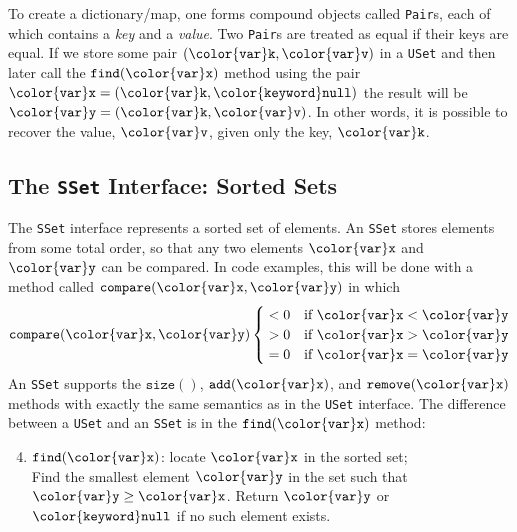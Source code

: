 \documentclass[10pt]{book}
\newcommand{\seclabel}[1]{\label{sec:#1}}
\theoremstyle{plain}
\theoremstyle{definition}
\begin{document}
To create a dictionary/map, one forms compound objects called \texttt{Pair}s,
%
each of which contains a \emph{key} and a \emph{value}. Two \texttt{Pair}s
are treated as equal if their keys are equal.  If we store some pair
$(\ensuremath{\mathtt{{\color{var}k}}},\ensuremath{\mathtt{{\color{var}v}}})$ in a \texttt{USet} and then later call the \ensuremath{\mathtt{find({\color{var}x})}} method using
the pair $\ensuremath{\mathtt{{\color{var}x}}}=(\ensuremath{\mathtt{{\color{var}k}}},\ensuremath{\mathtt{{\color{keyword}null}}})$ the result will be $\ensuremath{\mathtt{{\color{var}y}}}=(\ensuremath{\mathtt{{\color{var}k}}},\ensuremath{\mathtt{{\color{var}v}}})$.  In other
words, it is possible to recover the value, \ensuremath{\mathtt{{\color{var}v}}}, given only the key, \ensuremath{\mathtt{{\color{var}k}}}.


\subsection{The \texttt{SSet} Interface: Sorted Sets}
\seclabel{sset}

%
The \texttt{SSet} interface represents a sorted set of elements.  An \texttt{SSet}
stores elements from some total order, so that any two elements \ensuremath{\mathtt{{\color{var}x}}}
and \ensuremath{\mathtt{{\color{var}y}}} can be compared.  In code examples, this will be done with a
method called \ensuremath{\mathtt{compare({\color{var}x},{\color{var}y})}} in which
\[
    \ensuremath{\mathtt{compare({\color{var}x},{\color{var}y})}} 
      \begin{cases}
        {}<0 & \text{if $\ensuremath{\mathtt{{\color{var}x}}}<\ensuremath{\mathtt{{\color{var}y}}}$} \\
        {}>0 & \text{if $\ensuremath{\mathtt{{\color{var}x}}}>\ensuremath{\mathtt{{\color{var}y}}}$} \\
        {}=0 & \text{if $\ensuremath{\mathtt{{\color{var}x}}}=\ensuremath{\mathtt{{\color{var}y}}}$}
      \end{cases}
\]
%
An \texttt{SSet} supports the \ensuremath{\mathtt{size()}}, \ensuremath{\mathtt{add({\color{var}x})}}, and \ensuremath{\mathtt{remove({\color{var}x})}} methods with
exactly the same semantics as in the \texttt{USet} interface.  The difference
between a \texttt{USet} and an \texttt{SSet} is in the \ensuremath{\mathtt{find({\color{var}x})}} method:
\begin{enumerate}
\setcounter{enumi}{3}
\item \ensuremath{\mathtt{find({\color{var}x})}}: locate \ensuremath{\mathtt{{\color{var}x}}} in the sorted set; \\
   Find the smallest element \ensuremath{\mathtt{{\color{var}y}}} in the set such that $\ensuremath{\mathtt{{\color{var}y}}} \ge \ensuremath{\mathtt{{\color{var}x}}}$.
   Return \ensuremath{\mathtt{{\color{var}y}}} or \ensuremath{\mathtt{{\color{keyword}null}}} if no such element exists.
\end{enumerate}
\end{document}
